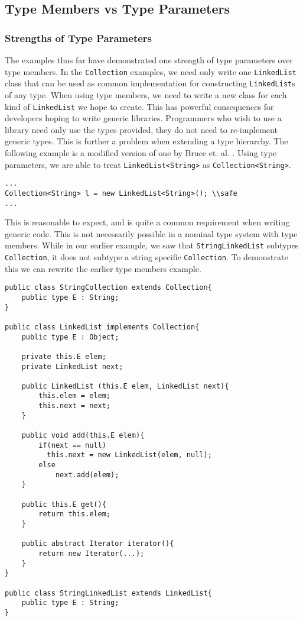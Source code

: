 \documentclass[11pt
              , a4paper
              , twoside
              , openright
              ]{report}
\numberwithin{case}{theorem}
\numberwithin{subcase}{case}
\begin{document}
\subsection{Type Members vs Type Parameters}
\subsubsection{Strengths of Type Parameters}

The examples thus far have demonstrated one strength of type parameters over type members. In the \verb|Collection| examples, we need only write one \verb|LinkedList| class that can be used as common implementation for constructing \verb|LinkedList|s of any type. When using type members, we need to write a new class for each kind of \verb|LinkedList| we hope to create. This has powerful consequences for developers hoping to write generic libraries. Programmers who wish to use a library need only use the types provided, they do not need to re-implement generic types. This is further a problem when extending a type hierarchy. The following example is a modified version of one by Bruce et. al. \cite{Bruce:1998:SSA:646155.679691}. Using type parameters, we are able to treat \verb|LinkedList<String>| as \verb|Collection<String>|.
\begin{lstlisting}[mathescape, style=customlang]
...
Collection<String> l = new LinkedList<String>(); \\safe
...
\end{lstlisting}
This is reasonable to expect, and is quite a common requirement when writing generic code. This is not necessarily possible in a nominal type system with type members. While in our earlier example, we saw that \verb|StringLinkedList| subtypes \verb|Collection|, it does not subtype a string specific \verb|Collection|. To demonstrate this we can rewrite the earlier type members example.
\begin{lstlisting}[mathescape, style=customlang]
public class StringCollection extends Collection{
	public type E : String;
}

public class LinkedList implements Collection{
	public type E : Object;

	private this.E elem;
	private LinkedList next;
	
	public LinkedList (this.E elem, LinkedList next){
		this.elem = elem;
		this.next = next;
	}
	
	public void add(this.E elem){
		if(next == null)
		  this.next = new LinkedList(elem, null);
		else
			next.add(elem);
	}
	
	public this.E get(){
		return this.elem;
	}
	
	public abstract Iterator iterator(){
		return new Iterator(...);
	}
}

public class StringLinkedList extends LinkedList{
	public type E : String;
}
\end{lstlisting}
\end{document}
